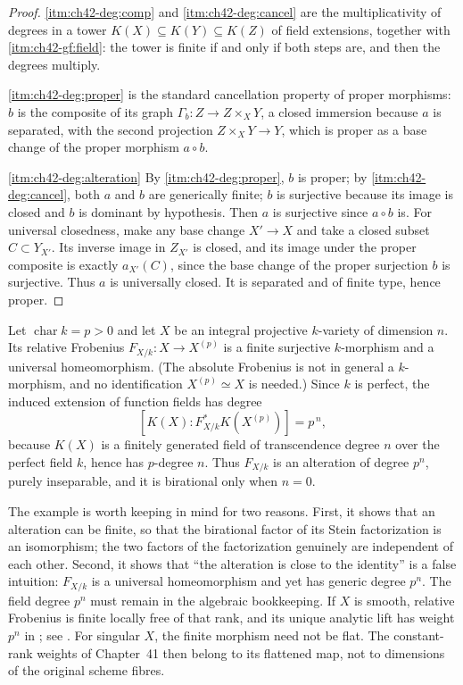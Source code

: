 \begin{proof}
\cref{itm:ch42-deg:comp} and \cref{itm:ch42-deg:cancel} are the multiplicativity
of degrees in a tower $K(X)\subseteq K(Y)\subseteq K(Z)$ of field
extensions, together with
\,\cref{itm:ch42-gf:field}: the tower is finite
if and only if both steps are, and then the degrees multiply.

\cref{itm:ch42-deg:proper} is the standard cancellation property of proper
morphisms: $b$ is the composite of its graph
$\Gamma_b:Z\to Z\times_XY$, a closed immersion because $a$ is separated,
with the second projection $Z\times_XY\to Y$, which is proper as a base
change of the proper morphism $a\circ b$.

\cref{itm:ch42-deg:alteration}  By \cref{itm:ch42-deg:proper}, $b$ is proper;
by \cref{itm:ch42-deg:cancel}, both $a$ and $b$ are generically finite;
$b$ is surjective because its image is closed and $b$ is dominant
by hypothesis.  Then $a$ is surjective since $a\circ b$ is.
For universal closedness, make any base change $X'\to X$ and take
a closed subset $C\subset Y_{X'}$.  Its inverse image in $Z_{X'}$
is closed, and its image under the proper composite is exactly
$a_{X'}(C)$, since the base change of the proper surjection $b$
is surjective.  Thus $a$ is universally closed.  It is separated
and of finite type, hence proper.
\end{proof}

\begin{example}
\label{ex:ch42-frobenius-alteration}
Let $\operatorname{char}k=p>0$ and let $X$ be an integral projective
$k$-variety of dimension $n$.  Its relative Frobenius
$F_{X/k}:X\to X^{(p)}$ is a finite surjective $k$-morphism and a
universal homeomorphism.  (The absolute Frobenius is not in general a
$k$-morphism, and no identification $X^{(p)}\simeq X$ is needed.)  Since
$k$ is perfect, the induced extension of function fields has degree
\[
 [K(X):F_{X/k}^*K(X^{(p)})]=p^{\,n},
\]
because $K(X)$ is a finitely generated field of transcendence degree $n$
over the perfect field $k$, hence has $p$-degree $n$.  Thus
$F_{X/k}$ is an alteration of degree $p^n$, purely inseparable, and it
is birational only when $n=0$.

The example is worth keeping in mind for two reasons.  First, it shows that
an alteration can be finite, so that the birational factor of its Stein
factorization is an isomorphism; the two factors of the factorization
genuinely are independent of each other.  Second, it shows that ``the
alteration is close to the identity'' is a false intuition:
$F_{X/k}$ is a universal homeomorphism and yet has generic degree
$p^n$.  The field degree $p^n$ must remain in the algebraic bookkeeping.
If $X$ is smooth, relative Frobenius is finite locally free of
that rank, and its unique analytic lift has weight $p^n$
in ; see
.
For singular $X$, the finite morphism need not be flat.
The constant-rank weights of Chapter~41 then belong to its flattened
map, not to dimensions of the original scheme fibres.
\end{example}

